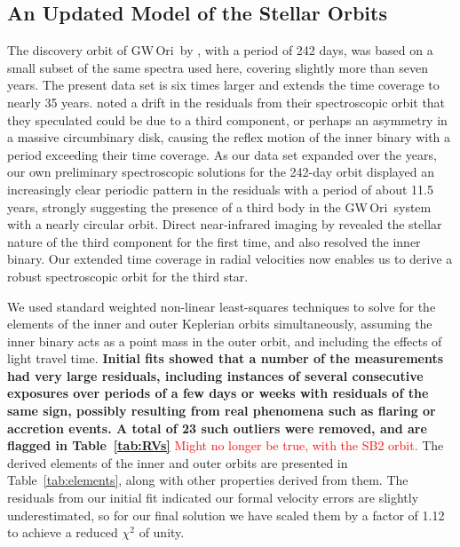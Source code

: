 \documentclass[twocolumn]{aastex61}
\newcommand{\todo}[1]{ \textcolor{red}{#1}}
\newcommand{\gw}{GW\,Ori}
\begin{document}
\subsection{An Updated Model of the Stellar Orbits} \label{sec:orbit}
The discovery orbit of \gw\ by \cite{mathieu91}, with a period of 242 days, was based on a small subset of the same spectra used here, covering slightly more than seven years. The present data set is six times larger and extends the time coverage to nearly 35 years. \cite{mathieu91} noted a drift in the residuals from their spectroscopic orbit that they speculated could be due to a third component, or perhaps an asymmetry in a massive circumbinary disk,
causing the reflex motion of the inner binary with a period exceeding their time coverage. As our data set expanded over the years, our own preliminary spectroscopic solutions for the 242-day orbit displayed an
increasingly clear periodic pattern in the residuals with a period of about 11.5 years, strongly suggesting the presence of a third body in the \gw\ system with a nearly circular orbit. Direct near-infrared
imaging by \cite{berger11} revealed the stellar nature of the third component for the first time, and also resolved the inner binary.  Our extended time coverage in radial velocities now enables us to derive a robust spectroscopic orbit for the third star.

We used standard weighted non-linear least-squares techniques \citep[e.g.,][]{press92} to solve for the elements of the inner and outer Keplerian orbits simultaneously, assuming the inner binary acts as a point mass in the outer orbit, and including the effects of light travel time. \textbf{Initial fits showed that a number of the measurements had very large residuals, including instances of several consecutive exposures over periods of a few days or weeks with residuals of the same sign, possibly resulting from real phenomena such as flaring or accretion events. A total of 23 such outliers were removed, and are flagged in Table~\ref{tab:RVs}} \todo{Might no longer be true, with the SB2 orbit.} The derived elements of the inner and outer orbits are presented in Table~\ref{tab:elements}, along with other properties derived from them. The residuals from our initial fit indicated our formal velocity errors are slightly underestimated, so for our final solution we have scaled them by a factor of 1.12 to achieve a reduced $\chi^2$ of unity.
\end{document}
